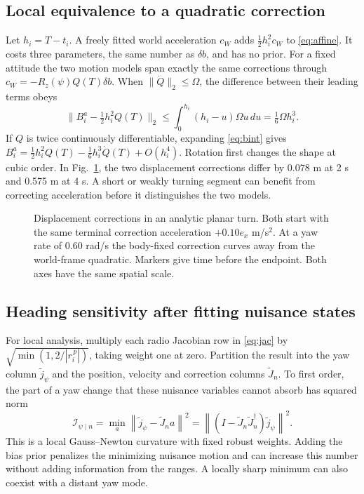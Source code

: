 \documentclass{IEEEtaes}
\newcommand{\rz}{R_z}
\newcommand{\norm}[1]{\left\lVert#1\right\rVert}
\begin{document}
\subsection{Local equivalence to a quadratic correction}
Let \(h_i=T-t_i\). A freely fitted world acceleration \(c_W\) adds \(\tfrac12 h_i^2 c_W\) to \eqref{eq:affine}. It costs three parameters, the same number as \(\delta b\), and has no prior. For a fixed attitude the two motion models span exactly the same corrections through \(c_W=-\rz(\psi)Q(T)\delta b\). When \(\|\dot Q\|_2\le\Omega\), the difference between their leading terms obeys
\begin{equation}
 \big\| B_i^a-\tfrac12 h_i^2 Q(T)\big\|_2
 \le \int_0^{h_i}(h_i-u)\Omega u\,du
 =\tfrac16\Omega h_i^3 . \label{eq:bound}
\end{equation}
If \(Q\) is twice continuously differentiable, expanding \eqref{eq:bint} gives \(B_i^a=\tfrac12h_i^2 Q(T)-\tfrac16h_i^3\dot Q(T)+O(h_i^4)\). Rotation first changes the shape at cubic order. In Fig.~\ref{fig:turn}, the two displacement corrections differ by 0.078 m at 2 s and 0.575 m at 4 s. A short or weakly turning segment can benefit from correcting acceleration before it distinguishes the two models.

\begin{figure}[t]
\centering

\caption{Displacement corrections in an analytic planar turn. Both start with the same terminal correction acceleration \(+0.10e_x\) m/s\(^2\). At a yaw rate of 0.60 rad/s the body-fixed correction curves away from the world-frame quadratic. Markers give time before the endpoint. Both axes have the same spatial scale.}
\label{fig:turn}
\end{figure}

\subsection{Heading sensitivity after fitting nuisance states}
For local analysis, multiply each radio Jacobian row in \eqref{eq:jac} by \(\sqrt{\min(1,2/|r_i^{\,p}|)}\), taking weight one at zero. Partition the result into the yaw column \(\tilde j_\psi\) and the position, velocity and correction columns \(\tilde J_n\). To first order, the part of a yaw change that these nuisance variables cannot absorb has squared norm
\begin{equation}
 \mathcal I_{\psi\mid n}
 =\min_a\norm{\tilde j_\psi-\tilde J_n a}^2
 =\norm{(I-\tilde J_n\tilde J_n^\dagger)\tilde j_\psi}^2 .
 \label{eq:curvature}
\end{equation}
This is a local Gauss--Newton curvature with fixed robust weights. Adding the bias prior penalizes the minimizing nuisance motion and can increase this number without adding information from the ranges. A locally sharp minimum can also coexist with a distant yaw mode.
\end{document}
